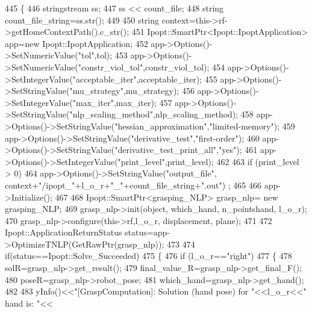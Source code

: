 \begin{DoxyCode}
445 \{
446     stringstream ss;
447     ss << count\_file;
448     \textcolor{keywordtype}{string} count\_file\_string=ss.str();
449 
450     \textcolor{keywordtype}{string} context=this->rf->getHomeContextPath().c\_str();
451     Ipopt::SmartPtr<Ipopt::IpoptApplication> app=\textcolor{keyword}{new} Ipopt::IpoptApplication;
452     app->Options()->SetNumericValue(\textcolor{stringliteral}{"tol"},tol);
453     app->Options()->SetNumericValue(\textcolor{stringliteral}{"constr\_viol\_tol"},constr_viol_tol);
454     app->Options()->SetIntegerValue(\textcolor{stringliteral}{"acceptable\_iter"},acceptable_iter);
455     app->Options()->SetStringValue(\textcolor{stringliteral}{"mu\_strategy"},mu_strategy);
456     app->Options()->SetIntegerValue(\textcolor{stringliteral}{"max\_iter"},max_iter);
457     app->Options()->SetStringValue(\textcolor{stringliteral}{"nlp\_scaling\_method"},nlp_scaling_method);
458     app->Options()->SetStringValue(\textcolor{stringliteral}{"hessian\_approximation"},\textcolor{stringliteral}{"limited-memory"});
459     app->Options()->SetStringValue(\textcolor{stringliteral}{"derivative\_test"},\textcolor{stringliteral}{"first-order"});
460     app->Options()->SetStringValue(\textcolor{stringliteral}{"derivative\_test\_print\_all"},\textcolor{stringliteral}{"yes"});    
461     app->Options()->SetIntegerValue(\textcolor{stringliteral}{"print\_level"},print_level);
462 
463     \textcolor{keywordflow}{if} (print_level > 0)
464         app->Options()->SetStringValue(\textcolor{stringliteral}{"output\_file"}, context+\textcolor{stringliteral}{"/ipopt\_"}+l\_o\_r+\textcolor{stringliteral}{"\_"}+count\_file\_string+\textcolor{stringliteral}{".out"})
      ;
465 
466     app->Initialize();
467 
468     Ipopt::SmartPtr<grasping\_NLP>  grasp\_nlp= \textcolor{keyword}{new} grasping_NLP;
469     grasp\_nlp->init(\textcolor{keywordtype}{object}, which\_hand, n_pointshand, l\_o\_r);
470     grasp\_nlp->configure(this->rf,l\_o\_r, displacement, plane);
471 
472     Ipopt::ApplicationReturnStatus status=app->OptimizeTNLP(GetRawPtr(grasp\_nlp));
473 
474     \textcolor{keywordflow}{if}(status==Ipopt::Solve\_Succeeded)
475     \{
476         \textcolor{keywordflow}{if} (l\_o\_r==\textcolor{stringliteral}{"right"})
477         \{
478             solR=grasp\_nlp->get\_result();
479             final_value_R=grasp\_nlp->get\_final\_F();
480             poseR=grasp\_nlp->robot\_pose;
481             which\_hand=grasp\_nlp->get\_hand();
482 
483             yInfo()<<\textcolor{stringliteral}{"[GraspComputation]: Solution (hand pose) for "}<<l\_o\_r<<\textcolor{stringliteral}{" hand is: "}<<

\end{DoxyCode}
